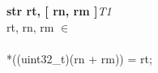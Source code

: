 


\begin{instructionblock}{\imagewidth}%
    \textbf{str rt, [ rn, rm ]}\hfill\textit{T1}\\
    rt, rn, rm $\in$ \baseregisters\\
    {}\\
    {*}((uint32\_t)(rn + rm)) = rt;
\end{instructionblock}

